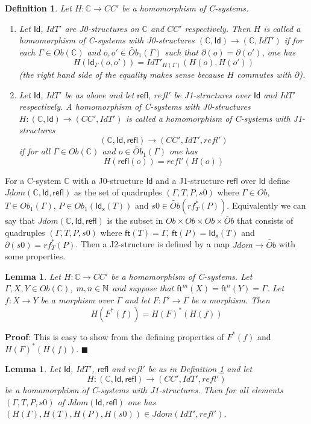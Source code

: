 \documentclass[12pt]{article}
\numberwithin{equation}{section}
\newenvironment{myproof}{{\bf Proof}:}{$\blacksquare$ \vskip 5mm }
\newtheorem{lemma}[proposition]{Lemma}
\newtheorem{definition}[proposition]{Definition}
\newcommand{\llabel}[1]{\label{#1}}
\newcommand{\sr}{\rightarrow}
\newcommand{\nn}{{\mathbb N\rm}}
\newcommand{\wt}{\widetilde}
\newcommand{\aCC}{{\mathbb C}}  %
\newcommand{\ft}{\mathsf{ft}}
\newcommand{\Id}{\mathsf{Id}} %
\newcommand{\refl}{\mathsf{refl}}
\newcommand{\Idx}{\mathsf{Id_x}} %
\begin{document}
%
\begin{definition}
\llabel{2015.04.06.def1} Let $H:\aCC\sr CC'$ be a homomorphism of C-systems.
%
\begin{enumerate}
\item Let $\Id$, $IdT'$ are J0-structures on $\aCC$ and $CC'$ respectively.  Then
  $H$ is called a homomorphism of C-systems with J0-structures $(\aCC,\Id)\sr
  (\aCC,IdT')$ if for each $\Gamma\in Ob(\aCC)$ and $o,o'\in\wt{Ob}_1(\Gamma)$ such
  that $\partial(o)=\partial(o')$, one has
%
$$H(\Id_{\Gamma}(o,o'))=IdT'_{H(\Gamma)}(H(o),H(o'))$$
%
(the right hand side of the equality makes sense because $H$ commutes with
  $\partial$).
% 
\item Let $\Id$, $IdT'$ be as above and let $\refl$, $refl'$ be J1-structures
  over $\Id$ and $IdT'$ respectively. A homomorphism of C-systems with
  J0-structures $H:(\aCC,\Id)\sr (CC',IdT')$ is called a homomorphism of
  C-systems with J1-structures
%
$$(\aCC,\Id,\refl)\sr (CC',IdT',refl')$$
%
if for all $\Gamma\in Ob(\aCC)$ and $o\in \wt{Ob}_1(\Gamma)$ one has
%
$$H(\refl(o))=refl'(H(o))$$
%
\end{enumerate}
\end{definition}
%
For a C-system $\aCC$ with a J0-structure $\Id$ and a J1-structure $\refl$ over
$\Id$ define $Jdom(\aCC,\Id,\refl)$ as the set of quadruples $(\Gamma,T,P,s0)$
where $\Gamma\in Ob$, $T\in Ob_1(\Gamma)$, $P\in Ob_1(\Idx(T))$ and $s0\in
\wt{Ob}(rf_T^*(P))$. Equivalently we can say that $Jdom(\aCC,\Id,\refl)$ is the
subset in $Ob\times Ob\times Ob\times \wt{Ob}$ that consists of quadruples
$(\Gamma,T,P,s0)$ where $\ft(T)=\Gamma$, $\ft(P)=\Idx(T)$ and
$\partial(s0)=rf_T^*(P)$. Then a J2-structure is defined by a map $Jdom\sr
\wt{Ob}$ with some properties.
%
\begin{lemma}
\llabel{2015.04.06.l3} Let $H:\aCC\sr CC'$ be a homomorphism of C-systems. Let
$\Gamma,X,Y\in Ob(\aCC)$, $m,n\in\nn$ and suppose that
$\ft^m(X)=\ft^{n}(Y)=\Gamma$. Let $f:X\sr Y$ be a morphism over $\Gamma$ and let
$F:\Gamma'\sr \Gamma$ be a morphism. Then
%
$$H(F^*(f))=H(F)^*(H(f))$$
%
\end{lemma}
%
\begin{myproof}
This is easy to show from the defining properties of $F^*(f)$ and
$H(F)^*(H(f))$.
\end{myproof}
%
%
\begin{lemma}
\llabel{2015.04.06.l2} Let $\Id$, $IdT'$, $\refl$ and $refl'$ be as in
Definition \ref{2015.04.06.def1} and let
%
$$H:(\aCC,\Id,\refl)\sr (CC',IdT',refl')$$
%
be a homomorphism of C-systems with J1-structures. Then for all elements
$(\Gamma,T,P,s0)$ of $Jdom(\Id,\refl)$ one has $(H(\Gamma),H(T),H(P),H(s0))\in
Jdom(IdT',refl')$.
\end{lemma}
\end{document}
